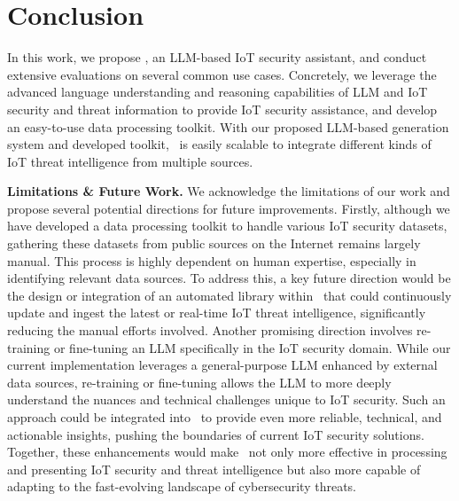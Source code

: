 \section{Conclusion}\label{sec:con}
In this work, we propose \chatiot, an LLM-based IoT security assistant, and conduct extensive evaluations on several common use cases. 
Concretely, we leverage the advanced language understanding and reasoning capabilities of LLM and IoT security and threat information to provide IoT security assistance, and develop an easy-to-use data processing toolkit. 
With our proposed LLM-based generation system and developed toolkit, \chatiot\ is easily scalable to integrate different kinds of IoT threat intelligence from multiple sources.

\smallskip
\noindent \textbf{Limitations \& Future Work.}
We acknowledge the limitations of our work and propose several potential directions for future improvements.
Firstly, although we have developed a data processing toolkit to handle various IoT security datasets, gathering these datasets from public sources on the Internet remains largely manual.
This process is highly dependent on human expertise, especially in identifying relevant data sources. 
To address this, a key future direction would be the design or integration of an automated library within \chatiot\ that could continuously update and ingest the latest or real-time IoT threat intelligence, significantly reducing the manual efforts involved.
Another promising direction involves re-training or fine-tuning an LLM specifically in the IoT security domain.
While our current implementation leverages a general-purpose LLM enhanced by external data sources, re-training or fine-tuning allows the LLM to more deeply understand the nuances and technical challenges unique to IoT security.
Such an approach could be integrated into \chatiot\ to provide even more reliable, technical, and actionable insights, pushing the boundaries of current IoT security solutions.
Together, these enhancements would make \chatiot\ not only more effective in processing and presenting IoT security and threat intelligence but also more capable of adapting to the fast-evolving landscape of cybersecurity threats.


